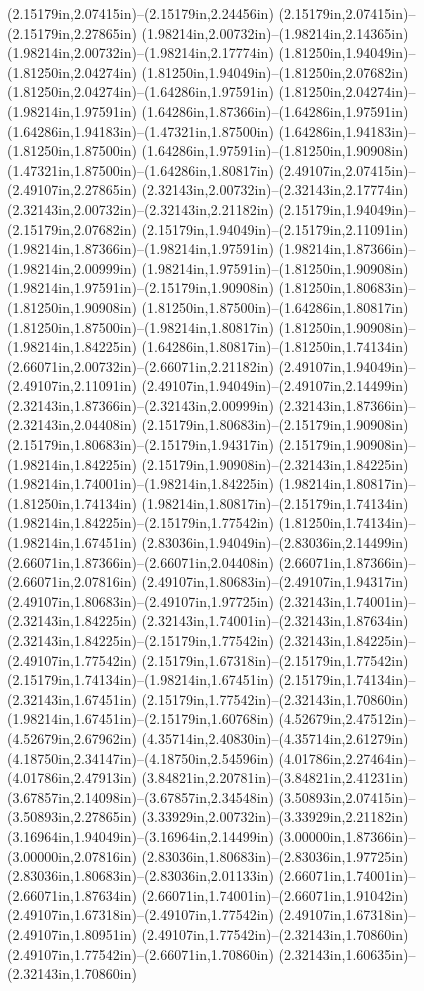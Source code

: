 (2.15179in,2.07415in)--(2.15179in,2.24456in) (2.15179in,2.07415in)--(2.15179in,2.27865in) (1.98214in,2.00732in)--(1.98214in,2.14365in) (1.98214in,2.00732in)--(1.98214in,2.17774in) (1.81250in,1.94049in)--(1.81250in,2.04274in) (1.81250in,1.94049in)--(1.81250in,2.07682in) (1.81250in,2.04274in)--(1.64286in,1.97591in) (1.81250in,2.04274in)--(1.98214in,1.97591in) (1.64286in,1.87366in)--(1.64286in,1.97591in) (1.64286in,1.94183in)--(1.47321in,1.87500in) (1.64286in,1.94183in)--(1.81250in,1.87500in) (1.64286in,1.97591in)--(1.81250in,1.90908in) (1.47321in,1.87500in)--(1.64286in,1.80817in) (2.49107in,2.07415in)--(2.49107in,2.27865in) (2.32143in,2.00732in)--(2.32143in,2.17774in) (2.32143in,2.00732in)--(2.32143in,2.21182in) (2.15179in,1.94049in)--(2.15179in,2.07682in) (2.15179in,1.94049in)--(2.15179in,2.11091in) (1.98214in,1.87366in)--(1.98214in,1.97591in) (1.98214in,1.87366in)--(1.98214in,2.00999in) (1.98214in,1.97591in)--(1.81250in,1.90908in) (1.98214in,1.97591in)--(2.15179in,1.90908in) (1.81250in,1.80683in)--(1.81250in,1.90908in) (1.81250in,1.87500in)--(1.64286in,1.80817in) (1.81250in,1.87500in)--(1.98214in,1.80817in) (1.81250in,1.90908in)--(1.98214in,1.84225in) (1.64286in,1.80817in)--(1.81250in,1.74134in) (2.66071in,2.00732in)--(2.66071in,2.21182in) (2.49107in,1.94049in)--(2.49107in,2.11091in) (2.49107in,1.94049in)--(2.49107in,2.14499in) (2.32143in,1.87366in)--(2.32143in,2.00999in) (2.32143in,1.87366in)--(2.32143in,2.04408in) (2.15179in,1.80683in)--(2.15179in,1.90908in) (2.15179in,1.80683in)--(2.15179in,1.94317in) (2.15179in,1.90908in)--(1.98214in,1.84225in) (2.15179in,1.90908in)--(2.32143in,1.84225in) (1.98214in,1.74001in)--(1.98214in,1.84225in) (1.98214in,1.80817in)--(1.81250in,1.74134in) (1.98214in,1.80817in)--(2.15179in,1.74134in) (1.98214in,1.84225in)--(2.15179in,1.77542in) (1.81250in,1.74134in)--(1.98214in,1.67451in) (2.83036in,1.94049in)--(2.83036in,2.14499in) (2.66071in,1.87366in)--(2.66071in,2.04408in) (2.66071in,1.87366in)--(2.66071in,2.07816in) (2.49107in,1.80683in)--(2.49107in,1.94317in) (2.49107in,1.80683in)--(2.49107in,1.97725in) (2.32143in,1.74001in)--(2.32143in,1.84225in) (2.32143in,1.74001in)--(2.32143in,1.87634in) (2.32143in,1.84225in)--(2.15179in,1.77542in) (2.32143in,1.84225in)--(2.49107in,1.77542in) (2.15179in,1.67318in)--(2.15179in,1.77542in) (2.15179in,1.74134in)--(1.98214in,1.67451in) (2.15179in,1.74134in)--(2.32143in,1.67451in) (2.15179in,1.77542in)--(2.32143in,1.70860in) (1.98214in,1.67451in)--(2.15179in,1.60768in) (4.52679in,2.47512in)--(4.52679in,2.67962in) (4.35714in,2.40830in)--(4.35714in,2.61279in) (4.18750in,2.34147in)--(4.18750in,2.54596in) (4.01786in,2.27464in)--(4.01786in,2.47913in) (3.84821in,2.20781in)--(3.84821in,2.41231in) (3.67857in,2.14098in)--(3.67857in,2.34548in) (3.50893in,2.07415in)--(3.50893in,2.27865in) (3.33929in,2.00732in)--(3.33929in,2.21182in) (3.16964in,1.94049in)--(3.16964in,2.14499in) (3.00000in,1.87366in)--(3.00000in,2.07816in) (2.83036in,1.80683in)--(2.83036in,1.97725in) (2.83036in,1.80683in)--(2.83036in,2.01133in) (2.66071in,1.74001in)--(2.66071in,1.87634in) (2.66071in,1.74001in)--(2.66071in,1.91042in) (2.49107in,1.67318in)--(2.49107in,1.77542in) (2.49107in,1.67318in)--(2.49107in,1.80951in) (2.49107in,1.77542in)--(2.32143in,1.70860in) (2.49107in,1.77542in)--(2.66071in,1.70860in) (2.32143in,1.60635in)--(2.32143in,1.70860in) 